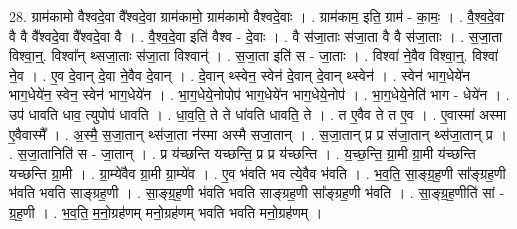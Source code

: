 \documentclass[17pt]{extarticle}
\begin{document}
28. ग्राम॑कामो वैश्वदे॒वा वै᳚श्वदे॒वा ग्राम॑कामो॒ ग्राम॑कामो वैश्वदे॒वाः । . ग्राम॑काम॒ इति॒ ग्राम॑ - का॒मः॒ । . वै॒श्व॒दे॒वा वै वै वै᳚श्वदे॒वा वै᳚श्वदे॒वा वै । . वै॒श्व॒दे॒वा इति॑ वैश्व - दे॒वाः । . वै स॑जा॒ताः स॑जा॒ता वै वै स॑जा॒ताः । . स॒जा॒ता विश्वा॒न्॒. विश्वा᳚न् थ्सजा॒ताः स॑जा॒ता विश्वान्॑ । . स॒जा॒ता इति॑ स - जा॒ताः । . विश्वा॑ ने॒वैव विश्वा॒न्॒. विश्वा॑ ने॒व । . ए॒व दे॒वान् दे॒वा ने॒वैव दे॒वान् । . दे॒वान् थ्स्वेन॒ स्वेन॑ दे॒वान् दे॒वान् थ्स्वेन॑ । . स्वेन॑ भाग॒धेये॑न भाग॒धेये॑न॒ स्वेन॒ स्वेन॑ भाग॒धेये॑न । . भा॒ग॒धेये॒नोपोप॑ भाग॒धेये॑न भाग॒धेये॒नोप॑ । . भा॒ग॒धेये॒नेति॑ भाग - धेये॑न । . उप॑ धावति धाव॒ त्युपोप॑ धावति । . धा॒व॒ति॒ ते ते धा॑वति धावति॒ ते । . त ए॒वैव ते त ए॒व । . ए॒वास्मा॑ अस्मा ए॒वैवास्मै᳚ । . अ॒स्मै॒ स॒जा॒तान् थ्स॑जा॒ता न॑स्मा अस्मै सजा॒तान् । . स॒जा॒तान् प्र प्र स॑जा॒तान् थ्स॑जा॒तान् प्र । . स॒जा॒तानिति॑ स - जा॒तान् । . प्र य॑च्छन्ति यच्छन्ति॒ प्र प्र य॑च्छन्ति । . य॒च्छ॒न्ति॒ ग्रा॒मी ग्रा॒मी य॑च्छन्ति यच्छन्ति ग्रा॒मी । . ग्रा॒म्ये॑वैव ग्रा॒मी ग्रा॒म्ये॑व । . ए॒व भ॑वति भव त्ये॒वैव भ॑वति । . भ॒व॒ति॒ सा॒ङ्ग्र॒ह॒णी सा᳚ङ्ग्रह॒णी भ॑वति भवति साङ्ग्रह॒णी । . सा॒ङ्ग्र॒ह॒णी भ॑वति भवति साङ्ग्रह॒णी सा᳚ङ्ग्रह॒णी भ॑वति । . सा॒ङ्ग्र॒ह॒णीति॑ सां - ग्र॒ह॒णी । . भ॒व॒ति॒ म॒नो॒ग्रह॑णम् मनो॒ग्रह॑णम् भवति भवति मनो॒ग्रह॑णम् । \newline
\end{document}
